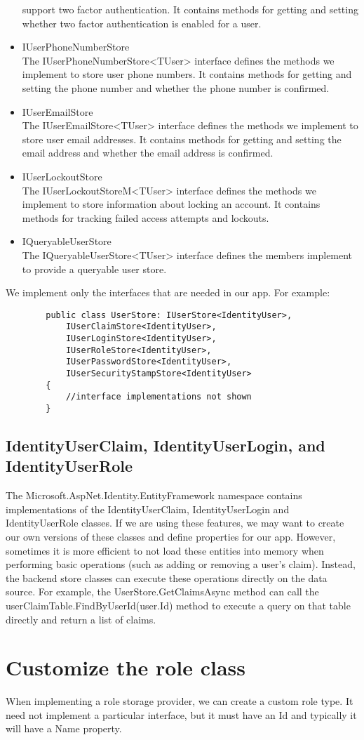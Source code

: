 \documentclass{report}
\begin{document}
\begin{itemize}
        support two factor authentication. It contains methods for getting and setting
        whether two factor authentication is enabled for a user.
        \item IUserPhoneNumberStore\\
        The IUserPhoneNumberStore<TUser> interface defines the methods we implement to
        store user phone numbers. It contains methods for getting and setting the phone
        number and whether the phone number is confirmed.
        \item IUserEmailStore\\
        The IUserEmailStore<TUser> interface defines the methods we implement to
        store user email addresses. It contains methods for getting and setting
        the email address and whether the email address is confirmed.
        \item IUserLockoutStore\\
        The IUserLockoutStoreM<TUser> interface defines the methods we implement to
        store information about locking an account. It contains methods for tracking
        failed access attempts and lockouts.
        \item IQueryableUserStore\\
        The IQueryableUserStore<TUser> interface defines the members
        implement to provide a queryable user store.
    \end{itemize}

    We implement only the interfaces that are needed in our app. For example:
    
    \lstset{style=sharpc}
    \begin{lstlisting}
        public class UserStore: IUserStore<IdentityUser>,
            IUserClaimStore<IdentityUser>,
            IUserLoginStore<IdentityUser>,
            IUserRoleStore<IdentityUser>,
            IUserPasswordStore<IdentityUser>,
            IUserSecurityStampStore<IdentityUser>
        {
            //interface implementations not shown
        }
    \end{lstlisting}

    \subsection{IdentityUserClaim, IdentityUserLogin, and IdentityUserRole}
    The Microsoft.AspNet.Identity.EntityFramework namespace contains implementations
    of the IdentityUserClaim, IdentityUserLogin and IdentityUserRole classes. If we
    are using these features, we may want to create our own versions of these classes
    and define properties for our app. However, sometimes it is more efficient to not
    load these entities into memory when performing basic operations (such as adding
    or removing a user's claim). Instead, the backend store classes can execute these
    operations directly on the data source. For example, the UserStore.GetClaimsAsync
    method can call the userClaimTable.FindByUserId(user.Id) method to execute a query
    on that table directly and return a list of claims.

    \section{Customize the role class}
    When implementing a role storage provider, we can create a custom role
    type. It need not implement a particular interface, but it must have an Id
    and typically it will have a Name property.
\end{document}
